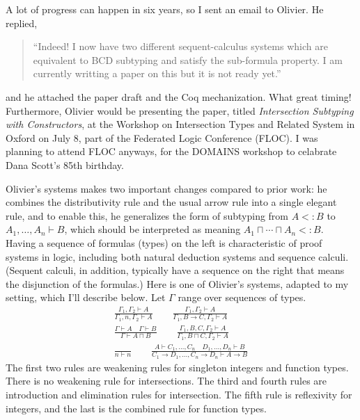 \documentclass{article}
\begin{document}
A lot of progress can happen in six years, so I sent an email to
Olivier. He replied,
\begin{quote}
``Indeed! I now have two different sequent-calculus systems which are
  equivalent to BCD subtyping and satisfy the sub-formula property.  I
  am currently writting a paper on this but it is not ready yet.''
\end{quote}
and he attached the paper draft and the Coq mechanization. What great
timing!  Furthermore, Olivier would be presenting the paper, titled
\emph{Intersection Subtyping with Constructors}, at the Workshop on
Intersection Types and Related System in Oxford on July 8, part of the
Federated Logic Conference (FLOC). I was planning to attend FLOC
anyways, for the DOMAINS workshop to celabrate Dana Scott's 85th
birthday.

Olivier's systems makes two important changes compared to prior work:
he combines the distributivity rule and the usual arrow rule into a
single elegant rule, and to enable this, he generalizes the form of
subtyping from $A <: B$ to $A_1,\ldots,A_n \vdash B$, which should be
interpreted as meaning $A_1 \sqcap \cdots \sqcap A_n <: B$.  Having a
sequence of formulas (types) on the left is characteristic of proof
systems in logic, including both natural deduction systems and
sequence calculi. (Sequent calculi, in addition, typically have a
sequence on the right that means the disjunction of the formulas.)
Here is one of Olivier's systems, adapted to my setting, which I'll
describe below. Let $\Gamma$ range over sequences of types.
\begin{gather*}
  \frac{\Gamma_1, \Gamma_2 \vdash A}
       {\Gamma_1 , n, \Gamma_2 \vdash A} \qquad
  \frac{\Gamma_1, \Gamma_2 \vdash A}
       {\Gamma_1 , B \to C, \Gamma_2 \vdash A}
   \\[2ex]
   \frac{\Gamma \vdash A \quad \Gamma \vdash B}{\Gamma \vdash A \sqcap B}
   \qquad
   \frac{\Gamma_1,B,C,\Gamma_2 \vdash A}{\Gamma_1,B\sqcap C,\Gamma_2 \vdash A}
   \\[2ex]
   \frac{}{n \vdash n}
   \qquad
   \frac{A \vdash C_1, \ldots, C_n \quad
         D_1, \ldots, D_n \vdash B}
        {C_1\to D_1,\ldots, C_n\to D_n \vdash A \to B}
\end{gather*}
The first two rules are weakening rules for singleton integers and
function types. There is no weakening rule for intersections.  The
third and fourth rules are introduction and elimination rules for
intersection. The fifth rule is reflexivity for integers, and the last
is the combined rule for function types.
\end{document}
